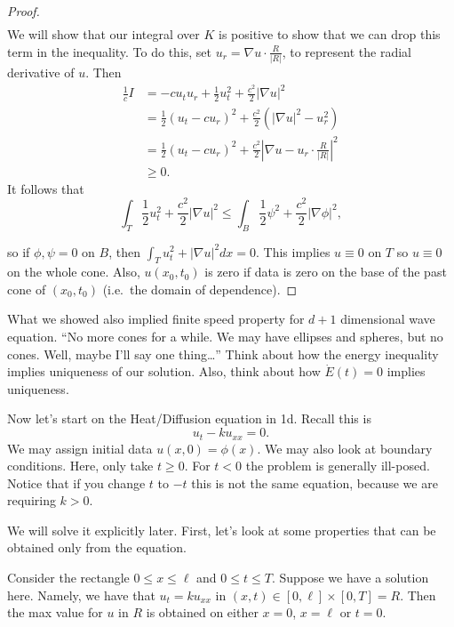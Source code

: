 \begin{proof}
\begin{align*}
	\end{align*}
	We will show that our integral over \( K \) is positive to show that we can drop this term in the inequality. To do this, set \( u_{r} = \nabla u \cdot \frac{R}{|R|} \), to represent the radial derivative of \( u \). Then
	\begin{align*}
		\frac{1}{c} I &= -c u_{t} u_{r} + \frac{1}{2} u_{t}^{2} + \frac{c^{2}}{2}| \nabla u|^{2}  \\
			&= \frac{1}{2} \left( u_{t} - c u_{r} \right)^{2} + \frac{c^{2}}{2} (| \nabla u|^{2} - u^{2}_{r}) \\
			&= \frac{1}{2} (u_{t} - cu_{r})^{2} + \frac{c^{2}}{2} \left| \nabla u - u_{r} \cdot \frac{R}{|R|} \right|^{2} \\
			&\ge 0.
	\end{align*}
	It follows that
	\[ \int_{T}  \frac{1}{2}u_{t}^{2} + \frac{c^{2}}{2} | \nabla u|^{2} \le \int_{B}  \frac{1}{2} \psi^{2} + \frac{c^{2}}{2} | \nabla \phi|^{2}, \]

	so if \( \phi, \psi = 0 \) on \( B \), then \( \int_{T} u_{t}^{2} + | \nabla u|^{2} dx = 0  \). This implies \( u \equiv 0 \) on \( T \) so \( u \equiv 0 \) on the whole cone. Also, \( u(x_{0}, t_{0}) \) is zero if data is zero on the base of the past cone of \( (x_{0}, t_{0}) \) (i.e.\ the domain of dependence).
\end{proof}

What we showed also implied finite speed property for \( d + 1 \) dimensional wave equation. ``No more cones for a while. We may have ellipses and spheres, but no cones. Well, maybe I'll say one thing\ldots'' Think about how the energy inequality implies uniqueness of our solution. Also, think about how \( \dot{E}(t) = 0 \) implies uniqueness.

Now let's start on the Heat/Diffusion equation in 1d. Recall this is
\[ \tag{\( k > 0 \)}u_{t} - k u_{x x} = 0. \]
We may assign initial data \( u(x, 0) = \phi(x) \). We may also look at boundary conditions. Here, only take \( t \ge 0 \). For \( t < 0 \) the problem is generally ill-posed. Notice that if you change \( t \) to \( -t \) this is not the same equation, because we are requiring \( k > 0 \).

We will solve it explicitly later. First, let's look at some properties that can be obtained only from the equation.
\begin{theorem}
	Consider the rectangle \( 0 \le x \le \ell \) and \( 0 \le t \le T \). Suppose we have a solution here. Namely, we have that \( u_{t} = k u_{x x} \) in \( (x, t) \in [0, \ell] \times [0, T] = R \). Then the max value for \( u \) in \( R \) is obtained on either \( x = 0 \), \( x = \ell \) or \( t = 0 \).
\end{theorem}

